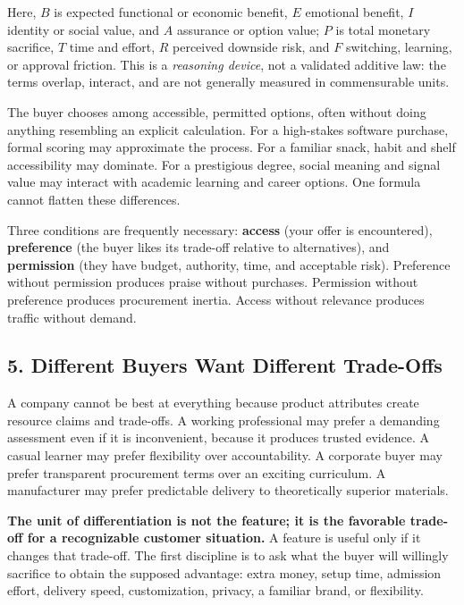 Here, $B$ is expected functional or economic benefit, $E$ emotional benefit, $I$ identity or social value, and $A$ assurance or option value; $P$ is total monetary sacrifice, $T$ time and effort, $R$ perceived downside risk, and $F$ switching, learning, or approval friction. This is a \emph{reasoning device}, not a validated additive law: the terms overlap, interact, and are not generally measured in commensurable units.

The buyer chooses among accessible, permitted options, often without doing anything resembling an explicit calculation. For a high-stakes software purchase, formal scoring may approximate the process. For a familiar snack, habit and shelf accessibility may dominate. For a prestigious degree, social meaning and signal value may interact with academic learning and career options. One formula cannot flatten these differences.

Three conditions are frequently necessary: \textbf{access} (your offer is encountered), \textbf{preference} (the buyer likes its trade-off relative to alternatives), and \textbf{permission} (they have budget, authority, time, and acceptable risk). Preference without permission produces praise without purchases. Permission without preference produces procurement inertia. Access without relevance produces traffic without demand.

\subsection*{5. Different Buyers Want Different Trade-Offs}

A company cannot be best at everything because product attributes create resource claims and trade-offs. A working professional may prefer a demanding assessment even if it is inconvenient, because it produces trusted evidence. A casual learner may prefer flexibility over accountability. A corporate buyer may prefer transparent procurement terms over an exciting curriculum. A manufacturer may prefer predictable delivery to theoretically superior materials.

\textbf{The unit of differentiation is not the feature; it is the favorable trade-off for a recognizable customer situation.} A feature is useful only if it changes that trade-off. The first discipline is to ask what the buyer will willingly sacrifice to obtain the supposed advantage: extra money, setup time, admission effort, delivery speed, customization, privacy, a familiar brand, or flexibility.

